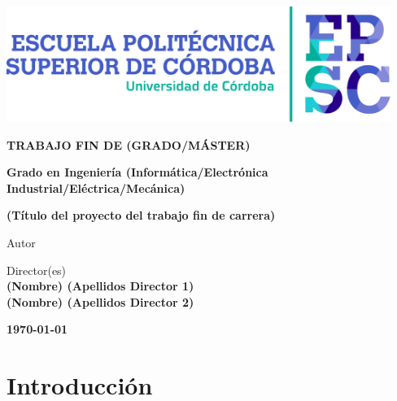 \documentclass[a4paper,12pt,twoside,final]{book}
\newcommand{\excluirpagina}[1]{\addtocounter{page}{-1}}
\begin{document}
\begin{center}
\fontfamily{\sfdefault}\selectfont
\vspace*{2cm}

\vfill
\vfill
\includegraphics[width=12.5cm]{LogotipoEPSC.pdf}
\vfill
\vfill

\large\textbf{\color{epsc:medio}
  TRABAJO FIN DE (GRADO/MÁSTER)
}
\vfill

\Large\textbf{\color{epsc:verde}
  Grado en Ingeniería (Informática/Electrónica Industrial/Eléctrica/Mecánica)
}
\vfill
\vfill

\Huge\textbf{\color{epsc:oscuro}
  (Título del proyecto del trabajo fin de carrera)
}
\vfill
\vfill

\large{\color{epsc:oscuro}Autor}\\
\textbf{\color{epsc:medio}{ (Nombre) (Apellidos Autor) }}
\vfill

\large{\color{epsc:oscuro} Director(es) }\\
\textbf{\color{epsc:medio} (Nombre) (Apellidos Director 1) \\ (Nombre) (Apellidos Director 2) }
\vfill



\textbf{\color{epsc:verde} \monthyeardate\today}
\vfill
\vfill
\vspace{2.7cm}
\end{center}


\afterpage{\null\newpage}
\newpage


\newpage
\thispagestyle{fancy} 
\excluirpagina

\tableofcontents
\newpage

\listoffigures

\newpage
\listoftables
\newpage

\setcounter{page}{1}


\section{Introducción}
\end{document}
